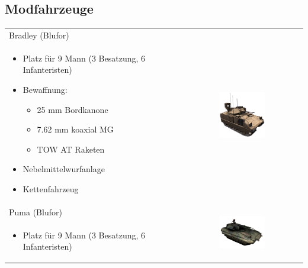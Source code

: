\subsection{Modfahrzeuge}
	\begin{longtable}{lc} 
		\toprule
		Bradley (Blufor) & \multirow{2}{*}{\includegraphics[width=0.4\textwidth]{./img/tutorials/sbz/bradley}}\\
		\begin{minipage}[t]{0.4\textwidth}
			\begin{itemize}
				\item Platz für 9 Mann (3 Besatzung, 6 Infanteristen)
				\item Bewaffnung:
				\begin{itemize}
					\item 25 mm Bordkanone
					\item 7.62 mm koaxial MG
					\item TOW AT Raketen
				\end{itemize}
				\item Nebelmittelwurfanlage
				\item Kettenfahrzeug
			\end{itemize}
		\end{minipage}\\
		\midrule
		Puma (Blufor) & \multirow{2}{*}{\includegraphics[width=0.4\textwidth]{./img/tutorials/sbz/puma}}\\
		\begin{minipage}[t]{0.4\textwidth}
			\begin{itemize}
				\item Platz für 9 Mann (3 Besatzung, 6 Infanteristen)

\end{itemize}
\end{minipage}
\end{longtable}
